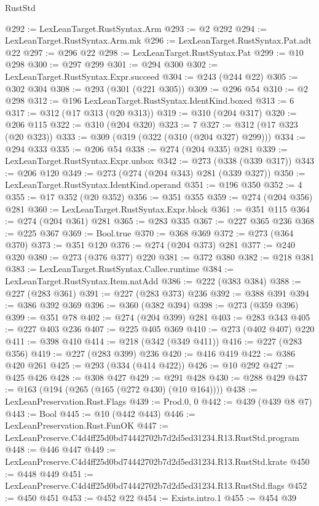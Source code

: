 \begin{lexlean}{RustStd}
\begin{coremodule}
@292 := LexLeanTarget.RustSyntax.Arm
@293 := @2 @292
@294 := LexLeanTarget.RustSyntax.Arm.mk
@296 := LexLeanTarget.RustSyntax.Pat.adt @22
@297 := @296 @22
@298 := LexLeanTarget.RustSyntax.Pat
@299 := @10 @298
@300 := @297 @299
@301 := @294 @300
@302 := LexLeanTarget.RustSyntax.Expr.succeed
@304 := @243 (@244 @22)
@305 := @302 @304
@308 := @293 (@301 (@221 @305))
@309 := @296 @54
@310 := @2 @298
@312 := @196 LexLeanTarget.RustSyntax.IdentKind.boxed
@313 := 6
@317 := @312 (@17 @313 (@20 @313))
@319 := @310 (@204 @317)
@320 := @206 @115
@322 := @310 (@204 @320)
@323 := 7
@327 := @312 (@17 @323 (@20 @323))
@333 := @309 (@319 (@322 (@310 (@204 @327) @299)))
@334 := @294 @333
@335 := @206 @54
@338 := @274 (@204 @335) @281
@339 := LexLeanTarget.RustSyntax.Expr.unbox
@342 := @273 (@338 (@339 @317))
@343 := @206 @120
@349 := @273 (@274 (@204 @343) @281 (@339 @327))
@350 := LexLeanTarget.RustSyntax.IdentKind.operand
@351 := @196 @350
@352 := 4
@355 := @17 @352 (@20 @352)
@356 := @351 @355
@359 := @274 (@204 @356) @281
@360 := LexLeanTarget.RustSyntax.Expr.block
@361 := @351 @115
@364 := @274 (@204 @361) @281
@365 := @283 @335
@367 := @227 @365 @236
@368 := @225 @367
@369 := Bool.true
@370 := @368 @369
@372 := @273 (@364 @370)
@373 := @351 @120
@376 := @274 (@204 @373) @281
@377 := @240 @320
@380 := @273 (@376 @377) @220
@381 := @372 @380
@382 := @218 @381
@383 := LexLeanTarget.RustSyntax.Callee.runtime
@384 := LexLeanTarget.RustSyntax.Item.natAdd
@386 := @222 (@383 @384)
@388 := @227 (@283 @361)
@391 := @227 (@283 @373) @236
@392 := @388 @391
@394 := @386 @392 @369
@396 := @360 (@382 @394)
@398 := @273 (@359 @396)
@399 := @351 @78
@402 := @274 (@204 @399) @281
@403 := @283 @343
@405 := @227 @403 @236
@407 := @225 @405 @369
@410 := @273 (@402 @407) @220
@411 := @398 @410
@414 := @218 (@342 (@349 @411))
@416 := @227 (@283 @356)
@419 := @227 (@283 @399) @236
@420 := @416 @419
@422 := @386 @420 @261
@425 := @293 (@334 (@414 @422))
@426 := @10 @292
@427 := @425 @426
@428 := @308 @427
@429 := @291 @428
@430 := @288 @429
@437 := @163 (@194 (@265 (@165 (@272 @430) (@10 @164))))
@438 := LexLeanPreservation.Rust.Flags
@439 := Prod.{0, 0}
@442 := @439 (@439 @8 @7)
@443 := Bool
@445 := @10 (@442 @443)
@446 := LexLeanPreservation.Rust.FunOK
@447 := LexLeanPreserve.C4d4ff25d0bd74442702b7d2d5ed31234.R13.RustStd.program
@448 := @446 @447
@449 := LexLeanPreserve.C4d4ff25d0bd74442702b7d2d5ed31234.R13.RustStd.krate
@450 := @448 @449
@451 := LexLeanPreserve.C4d4ff25d0bd74442702b7d2d5ed31234.R13.RustStd.flags
@452 := @450 @451
@453 := @452 @22
@454 := Exists.intro.{1}
@455 := @454 @39

\end{coremodule}
\end{lexlean}
